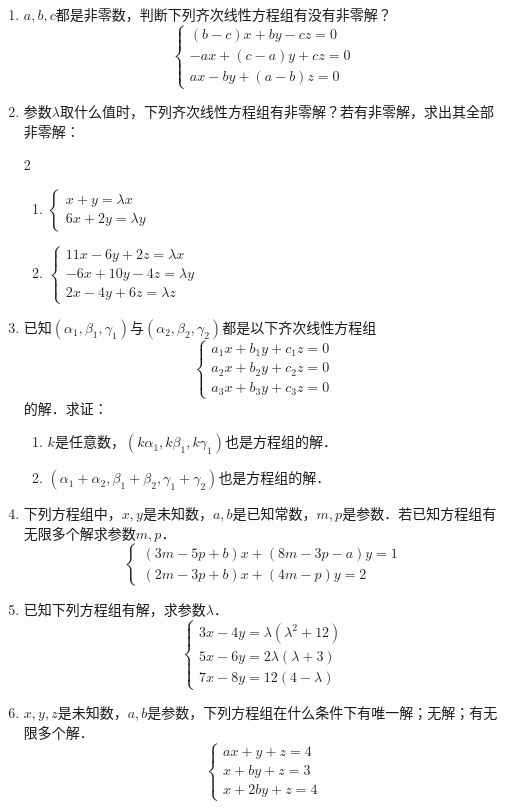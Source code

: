\begin{enumerate}
\item $a,b,c$都是非零数，判断下列齐次线性方程组有没有非零解？
\[\begin{cases}
    (b-c)x+by-cz=0\\
    -ax+(c-a)y+cz=0\\
    ax-by+(a-b)z=0
\end{cases}\]

\item 参数$\lambda$取什么值时，下列齐次线性方程组有非零解？若有非零解，求出其全部非零解：
\begin{multicols}{2}
\begin{enumerate}
    \item $\begin{cases}
        x+y=\lambda  x\\
        6x+2y=\lambda  y
    \end{cases}$
    \item $\begin{cases}
        11x-6y+2z=\lambda x\\
-6x+10y-4z=\lambda  y\\
2x-4y+6z=\lambda z
    \end{cases}$
\end{enumerate}
\end{multicols}

\item 已知$(\alpha_1,\beta_1,\gamma_1)$与$(\alpha_2,\beta_2,\gamma_2)$都是以下齐次线性方程组
\[\begin{cases}
    a_1x+b_1y+c_1z=0\\
    a_2x+b_2y+c_2z=0\\
    a_3x+b_3y+c_3z=0
\end{cases}\]
的解．求证：
\begin{enumerate}
    \item $k$是任意数，$(k\alpha_1,k\beta_1,k\gamma_1)$也是方程组的解．
    \item $(\alpha_1+\alpha_2,\beta_1+\beta_2,\gamma_1+\gamma_2)$也是方程组的解．
\end{enumerate}

\item 下列方程组中，$x,y$是未知数，$a,b$是已知常数，$m,p$是参数．若已知方程组有无限多个解求参数$m,p$．
\[\begin{cases}
    (3m-5p+b) x+ (8m-3p-a) y=1\\
    (2m-3p+b) x+ (4m-p) y=2
\end{cases}\]

\item 已知下列方程组有解，求参数$\lambda$．
\[\begin{cases}
    3x-4y=\lambda   (\lambda^2+12)\\
    5x-6y=2\lambda   (\lambda  +3)\\
    7x-8y=12 (4-\lambda  )
\end{cases}\]
\item $x,y,z$是未知数，$a,b$是参数，下列方程组在什么条件下有唯一解；无解；有无限多个解．
\[\begin{cases}
    ax+y+z=4\\
    x+by+z=3\\
    x+2by+z=4
\end{cases}\]


\end{enumerate}
